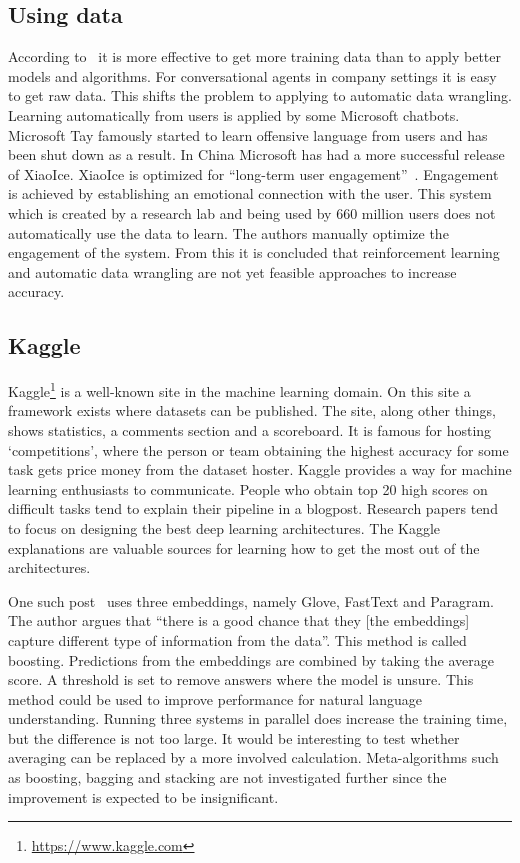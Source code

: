 \subsection{Using data}
\label{subsec:using_data}
According to~\citet{warden2018} it is more effective to get more training data than to apply better models and algorithms.
For conversational agents in company settings it is easy to get raw data.
This shifts the problem to applying to automatic data wrangling.
Learning automatically from users is applied by some Microsoft chatbots.
Microsoft Tay famously started to learn offensive language from users and has been shut down as a result.
In China Microsoft has had a more successful release of XiaoIce.
XiaoIce is optimized for ``long-term user engagement''~\citep{zhou2018design}.
Engagement is achieved by establishing an emotional connection with the user.
This system which is created by a research lab and being used by 660 million users does not automatically use the data to learn.
The authors manually optimize the engagement of the system.
From this it is concluded that reinforcement learning and automatic data wrangling are not yet feasible approaches to increase accuracy.

\subsection{Kaggle}
\label{subsec:kaggle}
Kaggle\footnote{\url{https://www.kaggle.com}} is a well-known site in the machine learning domain.
On this site a framework exists where datasets can be published.
The site, along other things, shows statistics, a comments section and a scoreboard.
It is famous for hosting `competitions', where the person or team obtaining the highest accuracy for some task gets price money from the dataset hoster.
Kaggle provides a way for machine learning enthusiasts to communicate.
People who obtain top 20 high scores on difficult tasks tend to explain their pipeline in a blogpost.
Research papers tend to focus on designing the best deep learning architectures.
The Kaggle explanations are valuable sources for learning how to get the most out of the architectures.

One such post~\citep{kumar2018} uses three embeddings, namely Glove, FastText and Paragram.
The author argues that ``there is a good chance that they [the embeddings] capture different type of information from the data''.
This method is called boosting.
Predictions from the embeddings are combined by taking the average score.
A threshold is set to remove answers where the model is unsure.
This method could be used to improve performance for natural language understanding.
Running three systems in parallel does increase the training time, but the difference is not too large.
It would be interesting to test whether averaging can be replaced by a more involved calculation.
Meta-algorithms such as boosting, bagging and stacking are not investigated further since the improvement is expected to be insignificant.

